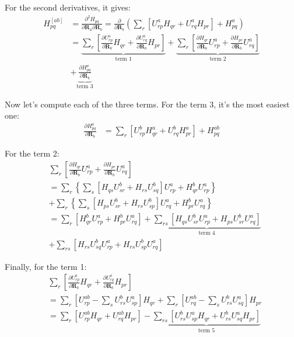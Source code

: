 For the second derivatives, it gives:
\begin{align}
\label{core_Hamiltonian_MO_INT_gradient_eq:2}
H_{pq}^{[ab]} &= \frac{\partial^{2} H_{pq}}{\partial \bm{R}_{a}\partial
\bm{R}_{b}} =  \frac{\partial}{\partial
\bm{R}_{b}}\left( \sum_{r}\left[U^{a}_{rp}H_{qr} + U^{a}_{rq}H_{pr}\right]  +
H^{a}_{pq}\right)  \nonumber \\
&= \underbrace{\sum_{r}\left[ 
\frac{\partial U^{a}_{rp} }{\partial \bm{R}_{b}}H_{qr} + 
\frac{\partial U^{a}_{rq} }{\partial \bm{R}_{b}}H_{pr}
\right]}_{\text{term 1}}  +
\underbrace{\sum_{r}\left[
\frac{\partial H_{qr} }{\partial \bm{R}_{b}}U^{a}_{rp} + 
\frac{\partial H_{pr} }{\partial \bm{R}_{b}}U^{a}_{rq}
\right]}_{\text{term 2}}  \nonumber \\
&+\underbrace{\frac{\partial H^{a}_{pq} }{\partial \bm{R}_{b}}}_{\text{term 3}}
\end{align}

Now let's compute each of the three terms. For the term 3, it's the most
easiest one:
\begin{align}
 \label{core_Hamiltonian_MO_INT_gradient_eq:3}
\frac{\partial H^{a}_{pq} }{\partial \bm{R}_{b}} &=
\sum_{r}\left[U^{b}_{rp}H^{a}_{qr} + U^{b}_{rq}H^{a}_{pr}\right]  + H^{ab}_{pq}
\end{align}

For the term 2:
\begin{align}
  \label{core_Hamiltonian_MO_INT_gradient_eq:4}
& \sum_{r}\left[
\frac{\partial H_{qr} }{\partial \bm{R}_{b}}U^{a}_{rp} + 
\frac{\partial H_{pr} }{\partial \bm{R}_{b}}U^{a}_{rq}
\right] \nonumber \\
&=\sum_{r} \left\lbrace\sum_{s} \left[H_{qs} U^{b}_{sr} +
H_{rs}U^{b}_{sq}\right]U^{a}_{rp} +  H^{b}_{qr}U^{a}_{rp} \right\rbrace
\nonumber \\
&+
\sum_{r} \left\lbrace\sum_{s} \left[H_{ps} U^{b}_{sr} +
H_{rs}U^{b}_{sp}\right]U^{a}_{rq} +  H^{b}_{pr}U^{a}_{rq} \right\rbrace
\nonumber \\
&= \sum_{r}\left[  H^{b}_{qr}U^{a}_{rp} + H^{b}_{pr}U^{a}_{rq}\right] +
\underbrace{\sum_{rs}\left[ H_{qs} U^{b}_{sr}U^{a}_{rp} + H_{ps}
U^{b}_{sr}U^{a}_{rq}\right]}_{\text{term 4}} \nonumber \\
&+  \sum_{rs}\left[ H_{rs}U^{b}_{sq}U^{a}_{rp} +
H_{rs}U^{b}_{sp}U^{a}_{rq}\right]
\end{align}

Finally, for the term 1:
\begin{align}
 \label{core_Hamiltonian_MO_INT_gradient_eq:5}
&\sum_{r}\left[ 
\frac{\partial U^{a}_{rp} }{\partial \bm{R}_{b}}H_{qr} + 
\frac{\partial U^{a}_{rq} }{\partial \bm{R}_{b}}H_{pr}
\right] \nonumber \\
& = \sum_{r}\left[ U^{ab}_{rp}  -
\sum_{s}U^{b}_{rs}U^{a}_{sp} \right]H_{qr} +
\sum_{r}\left[ U^{ab}_{rq}  -
\sum_{s}U^{b}_{rs}U^{a}_{sq} \right]H_{pr}
 \nonumber \\
&= \sum_{r}\left[  U^{ab}_{rp}H_{qr} + U^{ab}_{rq}H_{pr}\right] -
\underbrace{\sum_{rs}\left[ 
U^{b}_{rs}U^{a}_{sp} H_{qr} +
U^{b}_{rs}U^{a}_{sq} H_{pr}\right]}_{\text{term 5}} 
\end{align}

